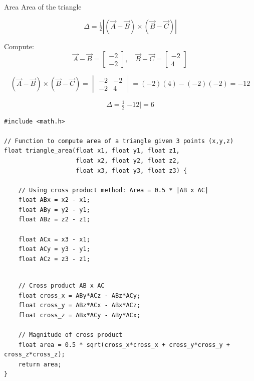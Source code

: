 \documentclass{beamer}
\begin{document}
\begin{frame}{Area}
Area of the triangle

\[
\Delta = \tfrac{1}{2} \left| (\vec{A}-\vec{B}) \times (\vec{B}-\vec{C}) \right|
\]

Compute:
\[
\vec{A} - \vec{B} = \begin{bmatrix} -2 \\ -2 \end{bmatrix}, \quad
\vec{B} - \vec{C} = \begin{bmatrix} -2 \\ 4 \end{bmatrix}
\]

\[
(\vec{A}-\vec{B}) \times (\vec{B}-\vec{C}) =
\begin{vmatrix}
-2 & -2 \\
-2 & 4
\end{vmatrix}
= (-2)(4) - (-2)(-2) = -12
\]

\[
\Delta = \tfrac{1}{2} | -12 | = 6
\]
\end{frame}

\begin{frame}[fragile]
    \begin{lstlisting}
#include <math.h>

// Function to compute area of a triangle given 3 points (x,y,z)
float triangle_area(float x1, float y1, float z1,
                    float x2, float y2, float z2,
                    float x3, float y3, float z3) {

    // Using cross product method: Area = 0.5 * |AB x AC|
    float ABx = x2 - x1;
    float ABy = y2 - y1;
    float ABz = z2 - z1;

    float ACx = x3 - x1;
    float ACy = y3 - y1;
    float ACz = z3 - z1;
     \end{lstlisting}
\end{frame}

\begin{frame}[fragile]
    \begin{lstlisting}

    // Cross product AB x AC
    float cross_x = ABy*ACz - ABz*ACy;
    float cross_y = ABz*ACx - ABx*ACz;
    float cross_z = ABx*ACy - ABy*ACx;

    // Magnitude of cross product
    float area = 0.5 * sqrt(cross_x*cross_x + cross_y*cross_y + cross_z*cross_z);
    return area;
}

     \end{lstlisting}
\end{frame}
\end{document}
